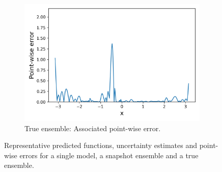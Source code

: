 \begin{figure}[H]
	\hspace{1cm}
	\begin{subfigure}[b]{.45\textwidth}
		\centering
		\includegraphics[width=1\linewidth]{./figs/ens_rep_err.png}  
		\caption{True ensemble: Associated point-wise error. \newline}
	\end{subfigure}
	\caption{Representative predicted functions, uncertainty estimates and point-wise errors for a single model, a snapshot ensemble and a true ensemble.}
\end{figure}

